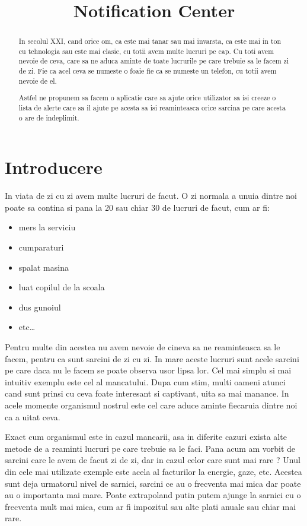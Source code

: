\documentclass[conference]{IEEEtran}
\begin{document}
\title{Notification Center}
\author{
}
\maketitle
\begin{abstract}
In secolul XXI, cand orice om, ca este mai tanar sau mai invarsta, ca este mai in ton cu tehnologia sau este mai clasic, cu totii avem multe lucruri pe cap. Cu toti avem nevoie de  ceva, care sa ne aduca aminte de toate lucrurile pe care trebuie sa le facem zi de zi. Fie ca acel ceva se numeste o foaie fie ca se numeste un telefon, cu totii avem nevoie de el.

Astfel ne propunem sa facem o aplicatie care sa ajute orice utilizator sa isi creeze o lista de alerte care sa il ajute pe acesta sa isi reaminteasca orice sarcina pe care acesta o are de indeplimit.
\end{abstract}
\IEEEpeerreviewmaketitle
\section{Introducere}
In viata de zi cu zi avem multe lucruri de facut. O zi normala a unuia dintre noi poate sa contina si pana la 20 sau chiar 30 de lucruri de facut, cum ar fi: 
\begin{itemize}
  \item mers la serviciu
  \item cumparaturi
  \item spalat masina
  \item luat copilul de la scoala
  \item dus gunoiul
  \item etc\ldots
\end{itemize}

Pentru multe din acestea nu avem nevoie de cineva sa ne reaminteasca sa le facem, pentru ca sunt sarcini de zi cu zi. In mare aceste lucruri sunt acele sarcini pe care daca nu le facem se poate observa usor lipsa lor. Cel mai simplu si mai intuitiv exemplu este cel al  mancatului. Dupa cum stim, multi oameni atunci cand sunt prinsi cu ceva foate interesant si captivant, uita sa mai manance. In acele momente organismul nostrul este cel care aduce aminte fiecaruia dintre noi ca a uitat ceva. 

Exact cum organismul este in cazul mancarii, asa in diferite cazuri exista alte metode de a reaminti lucruri pe care trebuie sa le faci. Pana acum am vorbit de sarcini care le avem de facut zi de zi, dar in cazul celor care sunt mai rare ? Unul din cele mai utilizate exemple este acela al facturilor la energie, gaze, etc. Acestea sunt deja urmatorul nivel de sarnici, sarcini ce au o frecventa mai mica dar poate au o importanta mai mare. Poate extrapoland putin putem ajunge la sarnici cu o frecventa mult mai mica, cum ar fi impozitul sau alte plati anuale sau chiar mai rare.
\end{document}
